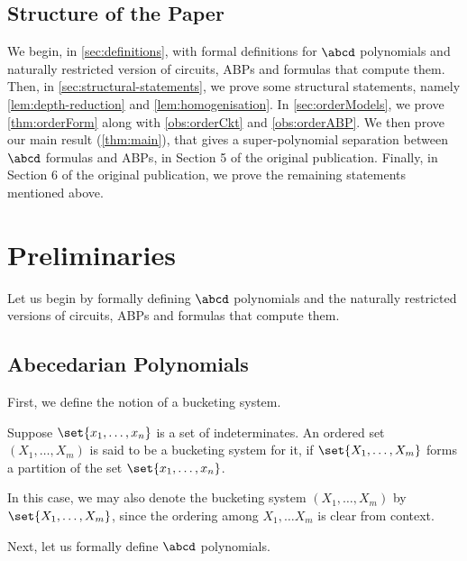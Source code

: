\subsection{Structure of the Paper}

We begin, in \autoref{sec:definitions}, with formal definitions for $\abcd$ polynomials and naturally restricted version of circuits, ABPs and formulas that compute them.
Then, in \autoref{sec:structural-statements}, we prove some structural statements, namely \autoref{lem:depth-reduction} and \autoref{lem:homogenisation}.
In \autoref{sec:orderModels}, we prove \autoref{thm:orderForm} along with \autoref{obs:orderCkt} and \autoref{obs:orderABP}.
We then prove our main result (\autoref{thm:main}), that gives a super-polynomial separation between $\abcd$ formulas and ABPs, in Section 5 of the original publication.
Finally, in Section 6 of the original publication, we prove the remaining statements mentioned above.

%

\section{Preliminaries}\label{sec:definitions}

Let us begin by formally defining $\abcd$ polynomials and the naturally restricted versions of circuits, ABPs and formulas that compute them.

\subsection{Abecedarian Polynomials}\label{sec:defn_abcd_poly}

First, we define the notion of a bucketing system.

\begin{definition}
	Suppose $\set{x_1, \ldots, x_n}$ is a set of indeterminates.
	An ordered set $(X_1, \ldots, X_m)$ is said to be a bucketing system for it, if $\set{X_1, \ldots, X_m}$ forms a partition of the set $\set{x_1, \ldots, x_n}$.

	In this case, we may also denote the bucketing system $(X_1, \ldots, X_m)$ by $\set{X_1, \ldots, X_m}$, since the ordering among $X_1, \ldots X_m$ is clear from context.	
\end{definition}

\noindent Next, let us formally define $\abcd$ polynomials. 

